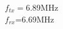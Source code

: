 \documentclass[preview]{standalone}
\begin{document}
\begin{center}
$f_{tx}=$6.89MHz\\$f_{rx}$=6.69MHz
\end{center}
\end{document}
